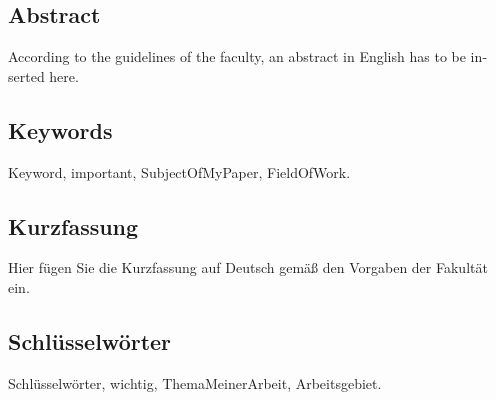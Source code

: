 \begin{otherlanguage}{english}
  
  \chapter*{Abstract}

  According to the guidelines of the faculty, an abstract in English has to be inserted here.

  \bigskip

  \section*{Keywords}
  Keyword, important, SubjectOfMyPaper, FieldOfWork. 

\end{otherlanguage}

\begin{otherlanguage}{ngerman}
 
  \chapter*{Kurzfassung}

  Hier fügen Sie die Kurzfassung auf Deutsch gemäß den Vorgaben der Fakultät ein.
  
  \bigskip
  
  \section*{Schlüsselwörter}
  Schlüsselwörter, wichtig, ThemaMeinerArbeit, Arbeitsgebiet. 

\end{otherlanguage}